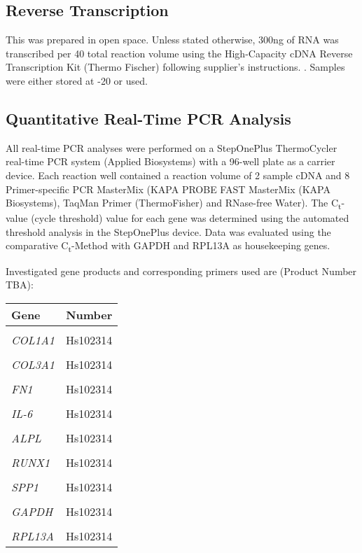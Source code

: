 \subsection{Reverse Transcription}
This was prepared in open space. Unless stated otherwise, 300ng of RNA was transcribed per 40\mul{} total reaction volume using the High-Capacity cDNA Reverse Transcription Kit (Thermo Fischer) following supplier's instructions. . Samples were either stored at -20 \degC or used. 

\subsection{Quantitative Real-Time PCR Analysis}
All real-time PCR analyses were performed on a StepOnePlus ThermoCycler real-time PCR system (Applied Biosystems) with a 96-well plate as a carrier device. Each reaction well contained a reaction volume of 2\mul{} sample cDNA and 8\mul{} Primer-specific PCR MasterMix (KAPA PROBE FAST MasterMix (KAPA Biosystems), TaqMan\textregistered{} Primer (ThermoFisher) and RNase-free Water). The C\textsubscript{t}-value (cycle threshold) value for each gene was determined using the automated threshold analysis in the StepOnePlus device. Data was evaluated using the comparative C\textsubscript{t}-Method with GAPDH and RPL13A as housekeeping genes.

Investigated gene products and corresponding primers used are (Product Number TBA): 

\begin{tabular}{lr}
	Gene & Number \\ 
	\hline 
	\rule[-1ex]{0pt}{4ex}  &  \\ 
	\textit{COL1A1} & Hs102314 \\ 
	\hline 
	\rule[-1ex]{0pt}{2.5ex}  &  \\ 
	\textit{COL3A1} & Hs102314 \\ 
	\hline 
	\rule[-1ex]{0pt}{2.5ex}  &  \\ 
	\textit{FN1} & Hs102314 \\ 
	\hline 
	\rule[-1ex]{0pt}{2.5ex}  &  \\ 
	\textit{IL-6} & Hs102314 \\ 
	\hline 
	\rule[-1ex]{0pt}{2.5ex}  &  \\ 
	\textit{ALPL} & Hs102314 \\ 
	\hline 
	\rule[-1ex]{0pt}{2.5ex}  &  \\ 
	\textit{RUNX1} & Hs102314 \\ 
	\hline 
	\rule[-1ex]{0pt}{2.5ex}  &  \\ 
	\textit{SPP1} & Hs102314 \\ 
	\hline 
	\rule[-1ex]{0pt}{2.5ex}  &  \\ 
	\textit{GAPDH} & Hs102314 \\ 
	\hline 
	\rule[-1ex]{0pt}{2.5ex}  &  \\ 
	\textit{RPL13A} & Hs102314 \\ 
\end{tabular} 


